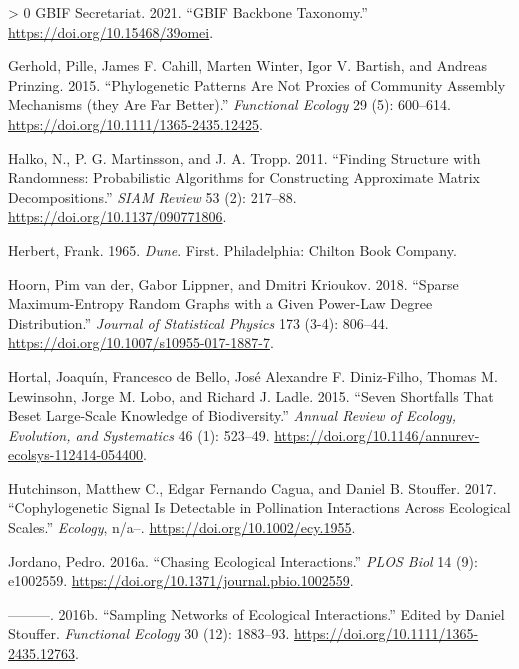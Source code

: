 \documentclass[10pt,oneside]{article}
\newlength{\cslhangindent}
\newenvironment{CSLReferences}[3] %
 {%
  \setlength{\parindent}{0pt}
  \ifodd #1 \everypar{\setlength{\hangindent}{\cslhangindent}}\ignorespaces\fi
  \ifnum #2 > 0
  \setlength{\parskip}{#2\baselineskip}
  \fi
 }%
 {}
\begin{document}
\begin{CSLReferences}{1}{0}
\leavevmode\hypertarget{ref-GBIFSecretariat2021GbiBac}{}%
GBIF Secretariat. 2021. {``GBIF Backbone Taxonomy.''}
\url{https://doi.org/10.15468/39omei}.

\leavevmode\hypertarget{ref-Gerhold2015PhyPat}{}%
Gerhold, Pille, James F. Cahill, Marten Winter, Igor V. Bartish, and
Andreas Prinzing. 2015. {``Phylogenetic Patterns Are Not Proxies of
Community Assembly Mechanisms (they Are Far Better).''} \emph{Functional
Ecology} 29 (5): 600--614.
\url{https://doi.org/10.1111/1365-2435.12425}.

\leavevmode\hypertarget{ref-Halko2011FinStr}{}%
Halko, N., P. G. Martinsson, and J. A. Tropp. 2011. {``Finding Structure
with Randomness: Probabilistic Algorithms for Constructing Approximate
Matrix Decompositions.''} \emph{SIAM Review} 53 (2): 217--88.
\url{https://doi.org/10.1137/090771806}.

\leavevmode\hypertarget{ref-Herbert1965Dun}{}%
Herbert, Frank. 1965. \emph{Dune}. First. Philadelphia: Chilton Book
Company.

\leavevmode\hypertarget{ref-vanderHoorn2018SpaMax}{}%
Hoorn, Pim van der, Gabor Lippner, and Dmitri Krioukov. 2018. {``Sparse
Maximum-Entropy Random Graphs with a Given Power-Law Degree
Distribution.''} \emph{Journal of Statistical Physics} 173 (3-4):
806--44. \url{https://doi.org/10.1007/s10955-017-1887-7}.

\leavevmode\hypertarget{ref-Hortal2015SevSho}{}%
Hortal, Joaquín, Francesco de Bello, José Alexandre F. Diniz-Filho,
Thomas M. Lewinsohn, Jorge M. Lobo, and Richard J. Ladle. 2015. {``Seven
Shortfalls That Beset Large-Scale Knowledge of Biodiversity.''}
\emph{Annual Review of Ecology, Evolution, and Systematics} 46 (1):
523--49. \url{https://doi.org/10.1146/annurev-ecolsys-112414-054400}.

\leavevmode\hypertarget{ref-Hutchinson2017CopSig}{}%
Hutchinson, Matthew C., Edgar Fernando Cagua, and Daniel B. Stouffer.
2017. {``Cophylogenetic Signal Is Detectable in Pollination Interactions
Across Ecological Scales.''} \emph{Ecology}, n/a--.
\url{https://doi.org/10.1002/ecy.1955}.

\leavevmode\hypertarget{ref-Jordano2016ChaEco}{}%
Jordano, Pedro. 2016a. {``Chasing Ecological Interactions.''} \emph{PLOS
Biol} 14 (9): e1002559.
\url{https://doi.org/10.1371/journal.pbio.1002559}.

\leavevmode\hypertarget{ref-Jordano2016SamNet}{}%
---------. 2016b. {``Sampling Networks of Ecological Interactions.''}
Edited by Daniel Stouffer. \emph{Functional Ecology} 30 (12): 1883--93.
\url{https://doi.org/10.1111/1365-2435.12763}.


\end{CSLReferences}
\end{document}
